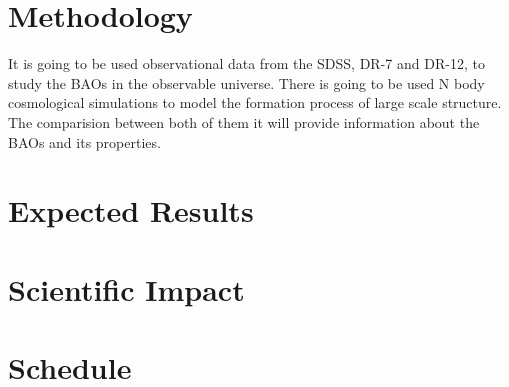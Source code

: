 \documentclass[a4,useAMS,usenatbib,usegraphicx,12pt]{article}
\begin{document}
\section{Methodology}

It is going to be used observational data from the SDSS, DR-7 and DR-12, to study the BAOs in the 
observable universe. 
There is going to be used N body cosmological simulations to model the formation process of large 
scale structure. 
The comparision between both of them it will provide information about the BAOs and its properties.  

\section{Expected Results}


\section{Scientific Impact}


\section{Schedule}
	



\renewcommand{\bibname}{8\ \ \ \ Bibliography}
\small

\end{document}
